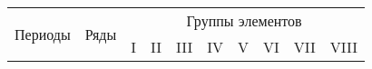 \documentclass[a4paper]{article}
\begin{document}
\begin{center}
\begin{tabular}{ |c|c|c|c|c|c|c|c|c|c| }
    \multirow{2}{*}{Периоды} & \multirow{2}{*}{Ряды} & \multicolumn{8}{|c|}{Группы элементов} \\
    && I & II & III & IV & V & VI & VII & VIII
\end{tabular}

\end{center}
\end{document}
